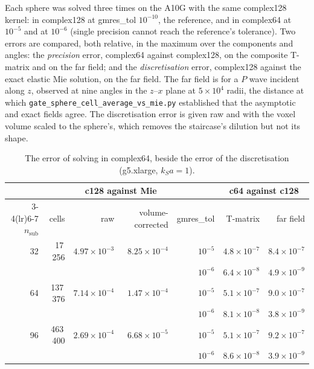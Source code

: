 \documentclass[11pt,a4paper]{article}
\newcommand{\nsub}{n_{\mathrm{sub}}}
\newcommand{\code}[1]{\nolinkurl{#1}}
\begin{document}
Each sphere was solved three times on the A10G with the same complex128 kernel: in complex128 at gmres\_tol
$10^{-10}$, the reference, and in complex64 at $10^{-5}$ and at $10^{-6}$ (single precision cannot reach the
reference's tolerance). Two errors are compared, both relative, in the maximum over the components and angles: the
\emph{precision} error, complex64 against complex128, on the composite T-matrix and on the far field; and the
\emph{discretisation} error, complex128 against the exact elastic Mie solution, on the far field. The far field is
for a $P$ wave incident along $z$, observed at nine angles in the $z$--$x$ plane at $5\times10^4$ radii, the distance at
which \code{gate_sphere_cell_average_vs_mie.py} established that the asymptotic and exact fields agree. The
discretisation error is given raw and with the voxel volume scaled to the sphere's, which removes the staircase's
dilution but not its shape.

\begin{table}[h]
\centering
\caption{The error of solving in complex64, beside the error of the discretisation (g5.xlarge, $k_S a = 1$).}
\label{tab:precision}
\begin{tabular}{rr rr rrr}
\toprule
& & \multicolumn{2}{c}{c128 against Mie} & & \multicolumn{2}{c}{c64 against c128} \\
\cmidrule(lr){3-4}\cmidrule(lr){6-7}
$\nsub$ & cells & raw & volume-corrected & gmres\_tol & T-matrix & far field \\
\midrule
32 & 17\,256 & $4.97\times10^{-3}$ & $8.25\times10^{-4}$ & $10^{-5}$ & $4.8\times10^{-7}$ & $8.4\times10^{-7}$ \\
   &         &                     &                     & $10^{-6}$ & $6.4\times10^{-8}$ & $4.9\times10^{-9}$ \\
64 & 137\,376 & $7.14\times10^{-4}$ & $1.47\times10^{-4}$ & $10^{-5}$ & $5.1\times10^{-7}$ & $9.0\times10^{-7}$ \\
   &          &                     &                     & $10^{-6}$ & $8.1\times10^{-8}$ & $3.8\times10^{-9}$ \\
96 & 463\,400 & $2.69\times10^{-4}$ & $6.68\times10^{-5}$ & $10^{-5}$ & $5.1\times10^{-7}$ & $9.2\times10^{-7}$ \\
   &          &                     &                     & $10^{-6}$ & $8.6\times10^{-8}$ & $3.9\times10^{-9}$ \\
\bottomrule
\end{tabular}
\end{table}
\end{document}
